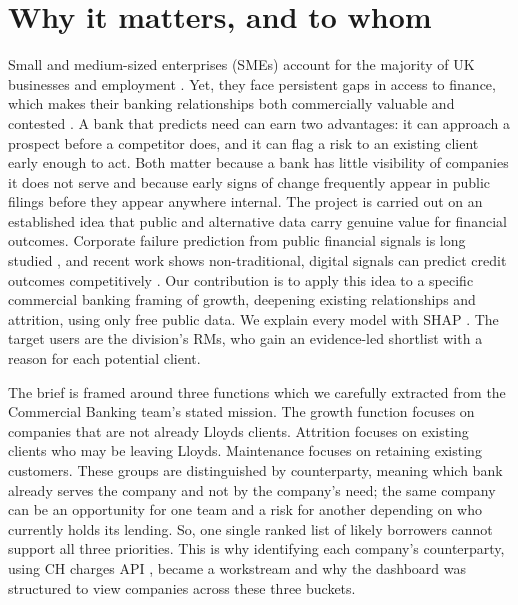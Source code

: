 \documentclass[    author={Samuel Menon Demelo; Sneha Saphala Ram Prasad; 
Viktor Ander Lindholm; Vishal Khatri},
               supervisor={Prof. Fernando Moreno-Pino},
                   degree={MSc},
                    title={Lloyds Commercial Banking Intelligence},
                 subtitle={Ranking SME Lending, Risk and Growth Prospects for Lloyds Banking Group},
                     type={},
                     year={2026}]{dissertation}
\begin{document}
\section{Why it matters, and to whom}
Small and medium-sized enterprises (SMEs) account for the majority of UK businesses and employment \cite{beis_bpe}. Yet, they face persistent gaps in access to finance, which makes their banking relationships both commercially valuable and contested \cite{bbb_2024,oecd_2024_sme}. A bank that predicts need can earn two advantages: it can approach a prospect before a competitor does, and it can flag a risk to an existing client early enough to act. Both matter because a bank has little visibility of companies it does not serve and because early signs of change frequently appear in public filings before they appear anywhere internal. The project is carried out on an established idea that public and alternative data carry genuine value for financial outcomes. Corporate failure prediction from public financial signals is long studied \cite{altman_1968}, and recent work shows non-traditional, digital signals can predict credit outcomes competitively \cite{berg_etal_2020}. Our contribution is to apply this idea to a specific commercial banking framing of growth, deepening existing relationships and attrition, using only free public data. We explain every model with SHAP \cite{lundberg_lee_2017}. The target users are the division's RMs, who gain an evidence-led shortlist with a reason for each potential client.

The brief is framed around three functions which we carefully extracted from the Commercial Banking team's stated mission. The growth function focuses on companies that are not already Lloyds clients. Attrition focuses on existing clients who may be leaving Lloyds. Maintenance focuses on retaining existing customers. These groups are distinguished by counterparty, meaning which bank already serves the company and not by the company's need; the same company can be an opportunity for one team and a risk for another depending on who currently holds its lending. So, one single ranked list of likely borrowers cannot support all three priorities. This is why identifying each company's counterparty, using CH charges API \cite{companieshouse_api}, became a workstream and why the dashboard was structured to view companies across these three buckets.
\end{document}
